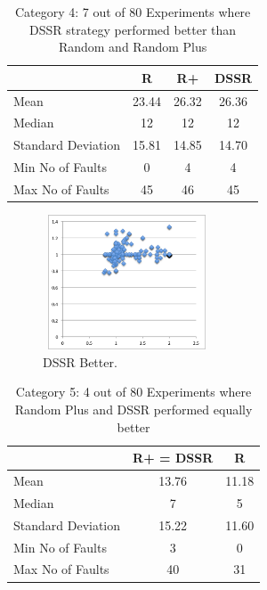 \documentclass[conference]{IEEEtran}
\begin{document}
\begin{table}[H]
\caption{Category 4: 7 out of 80 Experiments where DSSR strategy performed better than Random and Random Plus}
\centering
\begin{tabular}{|l|c|c|c|}
\hline\hline
 				& R			& R+ 			& DSSR \\
\hline
Mean  			&    23.44		&  26.32			&  26.36\\
Median 			&    12 		&  12 			&  12 \\
Standard Deviation 	&    15.81		&  14.85			&  14.70\\
Min No of Faults	&    0			&  4				&  4\\
Max No of Faults 	&    45		&  46				&  45\\
\hline
\end{tabular}
\label{table:DSSRbetter}
\end{table}


\begin{figure}[H]
\centering
\includegraphics[width=5cm,height=4cm]{DSSRbetter5.png}
\caption{DSSR Better.}
\label{fig:DSSRbetter}
\end{figure}




\begin{table}[H]
\caption{Category 5: 4 out of 80 Experiments where Random Plus and DSSR performed equally better}
\centering
\begin{tabular}{|l|c|c|}
\hline\hline
 				& R+ = DSSR			&  R \\[1ex]
\hline
Mean  			&    13.76				&  11.18\\
Median 			&    7 				&  5\\
Standard Deviation 	&    15.22				&  11.60\\
Min No of Faults	&    3					&  0\\
Max No of Faults 	&    40				&  31\\
\hline
\end{tabular}
\label{table:DSSRequaltoRandomPlus}
\end{table}
\end{document}
